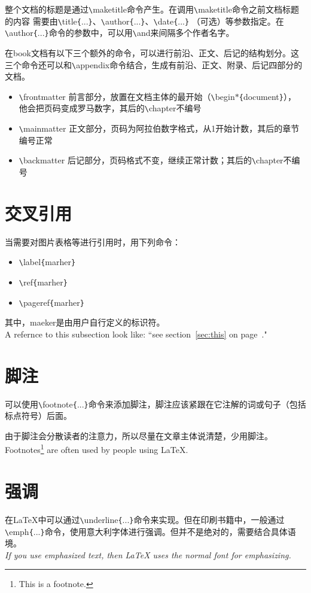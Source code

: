\documentclass[UTF8]{ctexart}
\begin{document}
整个文档的标题是通过\texttt{\textbackslash}maketitle命令产生。在调用\texttt{\textbackslash}maketitle命令之前文档标题的内容
需要由\texttt{\textbackslash}title\texttt{\{}...\texttt{\}}、\texttt{\textbackslash}author\texttt{\{}...\texttt{\}}、\texttt{\textbackslash}date\texttt{\{}...\texttt{\}}
（可选）等参数指定。在\texttt{\textbackslash}author\texttt{\{}...\texttt{\}}命令的参数中，可以用\texttt{\textbackslash}and来间隔多个作者名字。

\LaTeXe 在book文档有以下三个额外的命令，可以进行前沿、正文、后记的结构划分。这三个命令还可以和\texttt{\textbackslash}appendix命令结合，生成有前沿、正文、附录、后记四部分的文档。
\begin{itemize}
 \item \texttt{\textbackslash}frontmatter 前言部分，放置在文档主体的最开始（\texttt{\textbackslash}begin{$*$}\texttt{\{}document\texttt{\}}），
 他会把页码变成罗马数字，其后的\texttt{\textbackslash}chapter不编号
 \item \texttt{\textbackslash}mainmatter 正文部分，页码为阿拉伯数字格式，从1开始计数，其后的章节编号正常
 \item \texttt{\textbackslash}backmatter 后记部分，页码格式不变，继续正常计数；其后的\texttt{\textbackslash}chapter不编号
\end{itemize}
\section{交叉引用}
当需要对图片表格等进行引用时，用下列命令：
\begin{itemize}
  \item \texttt{\textbackslash}label\texttt{\{}marher\texttt{\}}
  \item \texttt{\textbackslash}ref\texttt{\{}marher\texttt{\}}
  \item \texttt{\textbackslash}pageref\texttt{\{}marher\texttt{\}}
\end{itemize}
其中，maeker是由用户自行定义的标识符。
\\

A refernce to this subsection
\label{sec:this} look like:
``see section~\ref{sec:this} on
page~\pageref{sec:this}."
\section{脚注}
可以使用\texttt{\textbackslash}footnote\texttt{\{}...\texttt{\}}命令来添加脚注，脚注应该紧跟在它注解的词或句子（包括标点符号）后面。

由于脚注会分散读者的注意力，所以尽量在文章主体说清楚，少用脚注。
\\

Footnotes\footnote{This is a footnote.} are often used by people using \LaTeX.
\section{强调}
在\LaTeX 中可以通过\texttt{\textbackslash}underline\texttt{\{}...\texttt{\}}命令来实现。但在印刷书籍中，一般通过
\texttt{\textbackslash}emph\texttt{\{}...\texttt{\}}命令，使用意大利字体进行强调。但并不是绝对的，需要结合具体语境。
\\

\emph{If you use emphasized text, then \LaTeX{} uses the \emph{normal} font for emphasizing.}
\end{document}
